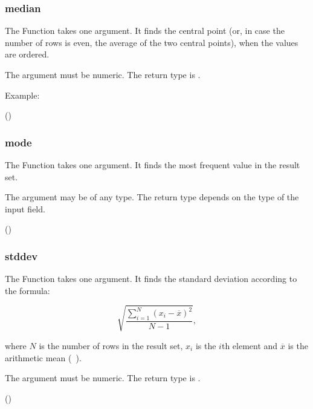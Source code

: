 \subsubsection{median}
The Function takes one argument.
It finds the central point (or, in case
the number of rows is even, the average
of the two central points), when the values are ordered.

The argument must be numeric.
The return type is .

Example:

 ()
 


\subsubsection{mode}
The Function takes one argument.
It finds the most frequent value in the result set.

The argument may be of any type.
The return type depends on the type of the input field.

 ()
 


\subsubsection{stddev}
The Function takes one argument.
It finds the standard deviation according to the formula:

\[
\sqrt{\frac{\sum_{i=1}^{N}{(x_i - \overline{x})^2}}{N-1}},
\]

where $N$ is the number of rows in the result set,
$x_i$ is the $i$th element and $\overline{x}$ is
the arithmetic mean (\ie\ ).

The argument must be numeric.
The return type is .

 ()
 


